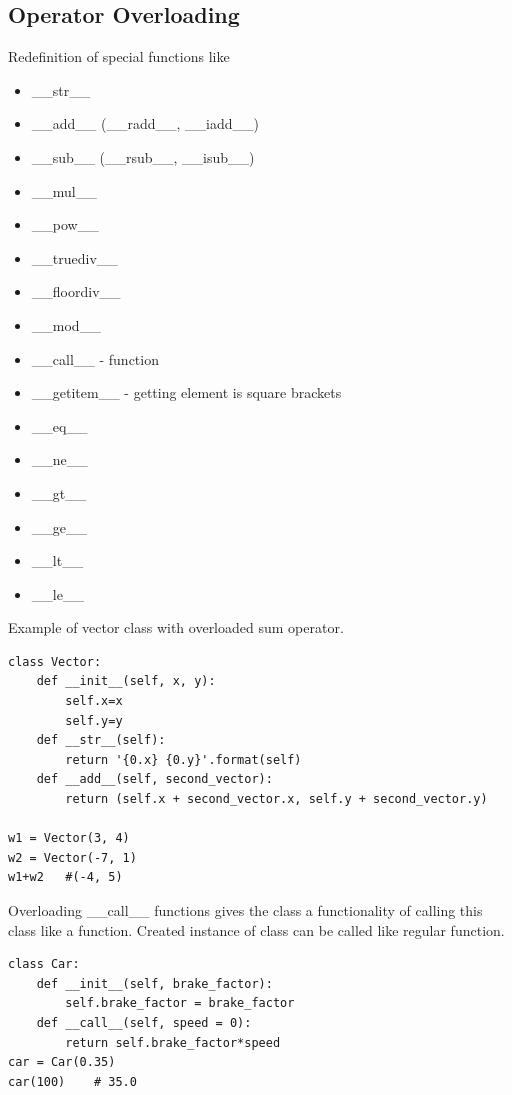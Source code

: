 \documentclass{article}
\begin{document}
\subsection{Operator Overloading}
Redefinition of special functions like
\begin{itemize}
\item \_\_str\_\_
\item \_\_add\_\_ (\_\_radd\_\_, \_\_iadd\_\_)
\item \_\_sub\_\_ (\_\_rsub\_\_, \_\_isub\_\_)
\item \_\_mul\_\_
\item \_\_pow\_\_
\item \_\_truediv\_\_
\item \_\_floordiv\_\_
\item \_\_mod\_\_
\item \_\_call\_\_ - function
\item \_\_getitem\_\_ - getting element is square brackets
\item \_\_eq\_\_
\item \_\_ne\_\_
\item \_\_gt\_\_
\item \_\_ge\_\_
\item \_\_lt\_\_
\item \_\_le\_\_
\end{itemize}
Example of vector class with overloaded sum operator.
\begin{lstlisting}[style=pystyle]
class Vector:
	def __init__(self, x, y):
		self.x=x
		self.y=y
	def __str__(self):
		return '{0.x} {0.y}'.format(self)
	def __add__(self, second_vector):
		return (self.x + second_vector.x, self.y + second_vector.y)
		
w1 = Vector(3, 4)
w2 = Vector(-7, 1)
w1+w2	#(-4, 5)
\end{lstlisting}
Overloading \_\_call\_\_ functions gives the class a functionality of calling this class like a function. Created instance of class can be called like regular function.
\begin{lstlisting}[style=pystyle]
class Car:
	def __init__(self, brake_factor):
		self.brake_factor = brake_factor
	def __call__(self, speed = 0):
		return self.brake_factor*speed
car = Car(0.35)
car(100)	# 35.0
\end{lstlisting}
\end{document}

